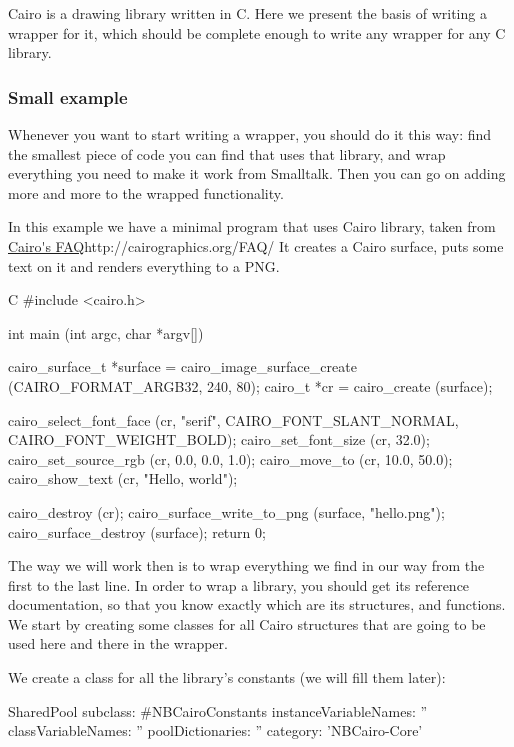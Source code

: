 \documentclass[a4paper,10pt,twoside]{book}
\begin{document}
Cairo is a drawing library written in C. Here we present the basis of writing a wrapper for it, which should be
complete enough to write any wrapper for any C library.


\subsubsection*{Small example}

Whenever you want to start writing a wrapper, you should do it this way: find the smallest piece of code you can find 
that uses that library, and wrap everything you need to make it work from Smalltalk. Then you can go on adding more and
more to the wrapped functionality. 

In this example we have a minimal program that uses Cairo library, taken from \url{Cairo's FAQ}{http://cairographics.org/FAQ/}
It creates a Cairo surface, puts some text on it
and renders everything to a PNG.

\begin{code}{C}
#include <cairo.h>

int
main (int argc, char *argv[])
{
        cairo_surface_t *surface =
            cairo_image_surface_create (CAIRO_FORMAT_ARGB32, 240, 80);
        cairo_t *cr =
            cairo_create (surface);

        cairo_select_font_face (cr, "serif", CAIRO_FONT_SLANT_NORMAL, CAIRO_FONT_WEIGHT_BOLD);
        cairo_set_font_size (cr, 32.0);
        cairo_set_source_rgb (cr, 0.0, 0.0, 1.0);
        cairo_move_to (cr, 10.0, 50.0);
        cairo_show_text (cr, "Hello, world");

        cairo_destroy (cr);
        cairo_surface_write_to_png (surface, "hello.png");
        cairo_surface_destroy (surface);
        return 0;
}
\end{code}

The way we will work then is to wrap everything we find in
our way from the first to the last line. In order to wrap a
library, you should get its reference documentation, so that
you know exactly which are its structures, and functions.
We start by creating some classes for all Cairo structures
that are going to be used here and there in the wrapper.

We create a class for all the library's constants (we will
fill them later):

\begin{classdef}{}
SharedPool subclass: #NBCairoConstants
	instanceVariableNames: ''
	classVariableNames: ''
	poolDictionaries: ''
	category: 'NBCairo-Core'
\end{classdef}
\end{document}
